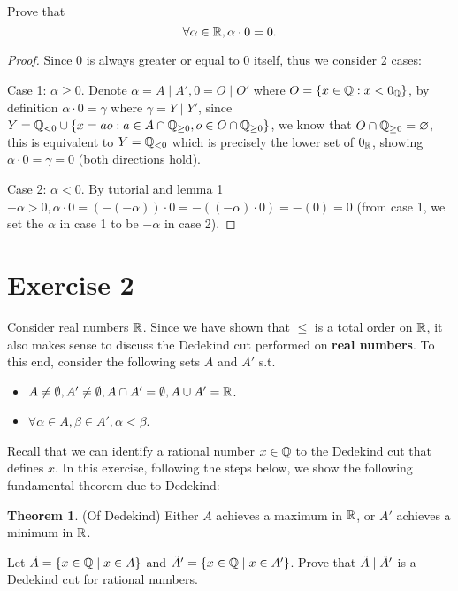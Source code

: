 \documentclass{homework}
\newcommand{\R}{\bb{R}} %
\newcommand{\Q}{\bb{Q}} %
\newcommand{\?}{\stackrel{?}{=}}
\theoremstyle{definition}
\newtheorem*{theorem}{Theorem}
\newtheorem*{lemma}{Lemma}
\begin{document}
 \question[4] Prove that $$\forall\alpha\in\R,\alpha\cdot0=0.$$
\begin{proof}
    Since $0$ is always greater or equal to $0$ itself, thus we consider 2 cases: 

    Case 1: $\alpha\geq0$. Denote $\alpha=A\mid A', 0=O\mid O'$ where $O=\{x\in\Q:x<0_\Q\}$, by definition $\alpha\cdot0=\gamma$ where $\gamma=Y\mid Y'$, since $Y=\Q_{<0}\cup\{x=ao:a\in A\cap\Q_{\geq0}, o\in O\cap\Q_{\geq0}\}$, we know that $O\cap\Q_{\geq0}=\varnothing$, this is equivalent to $Y=\Q_{<0}$ which is precisely the lower set of $0_\R$, showing $\alpha\cdot0=\gamma=0$ (both directions hold). 

    Case 2: $\alpha<0$. By tutorial and lemma 1 $-\alpha>0, \alpha\cdot0=(-(-\alpha))\cdot0=-((-\alpha)\cdot0)=-(0)=0$ (from case 1, we set the $\alpha$ in case 1 to be $-\alpha$ in case 2).  
\end{proof}


\newpage
\section*{Exercise 2}

Consider real numbers $\R$. Since we have shown that $\leq$ is a total order on $\R$, it also makes sense to discuss the Dedekind cut performed on \textbf{real numbers}. To this end, consider the following sets \textbf{$A$} and \textbf{$A'$} s.t.
\begin{itemize}
    \item $A\neq\emptyset, A'\neq\emptyset, A\cap A'=\emptyset, A\cup A'=\R$. 
    \item  $\forall \alpha\in A,\beta\in A', \alpha<\beta$. 
\end{itemize}
Recall that we can identify a rational number $x\in\Q$ to the Dedekind cut that defines $x$. In this exercise, following the steps below, we show the following fundamental theorem due to Dedekind:
\begin{theorem}
    (Of Dedekind) Either $A$ achieves a maximum in $\R$, or $A'$ achieves a minimum in $\R$.
\end{theorem}

\question[1] Let $\Tilde{A}=\{x\in\Q\mid x\in A\}$ and $\Tilde{A}'=\{x\in\Q\mid x\in A'\}$. Prove that $\Tilde{A}\mid\Tilde{A}'$ is a Dedekind cut for rational numbers. 
\end{document}

